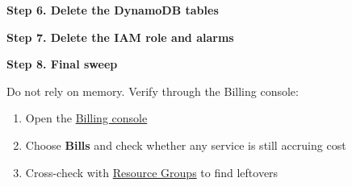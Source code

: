 \vspace{0.5em}\noindent\textbf{Step 6. Delete the DynamoDB
tables}\par

\begin{Shaded}
\begin{Highlighting}[]
\KeywordTok{;} 
   
\end{Highlighting}
\end{Shaded}

\vspace{0.5em}\noindent\textbf{Step 7. Delete the IAM role and
alarms}\par

\begin{Shaded}
\begin{Highlighting}[]
\DataTypeTok{\textbackslash{}}

\end{Highlighting}
\end{Shaded}

\vspace{0.5em}\noindent\textbf{Step 8. Final sweep}\par

Do not rely on memory. Verify through the Billing console:

\begin{enumerate}
\def\labelenumi{\arabic{enumi}.}
\tightlist
\item
  Open the \href{https://console.aws.amazon.com/billing/home}{Billing
  console}
\item
  Choose \textbf{Bills} and check whether any service is still accruing
  cost
\item
  Cross-check with
  \href{https://console.aws.amazon.com/resource-groups/}{Resource
  Groups} to find leftovers
\end{enumerate}

